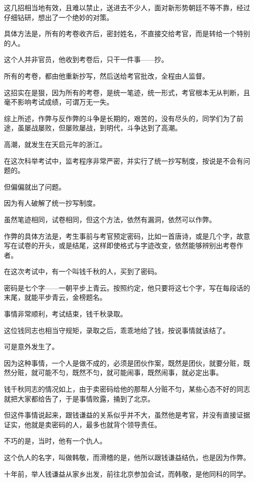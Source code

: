 \begin{multicols}{\theparacolNo}
这几招相当地有效，且难以禁止，送进去不少人，面对新形势朝廷不等不靠，经过仔细钻研，想出了一个绝妙的对策。

具体方法是，所有的考卷收齐后，密封姓名，不直接交给考官，而是转给一个特别的人。

这个人并非官员，他收到考卷后，只干一件事——抄。

所有的考卷，都由他重新抄写，然后送给考官批改，全程由人监督。

这招实在是狠，因为所有的考卷，是统一笔迹，统一形式，考官根本无从判断，且毫不影响考试成绩，可谓万无一失。

综上所述，作弊与反作弊的斗争是长期的，艰苦的，没有尽头的，同学们为了前途，虽屡战屡败，但屡败屡战，到明代，斗争达到了高潮。

高潮，就发生在天启元年的浙江。

在这次科举考试中，监考程序非常严密，并实行了统一抄写制度，按说是不会有问题的。

但偏偏就出了问题。

因为有人破解了统一抄写制度。

虽然笔迹相同，试卷相同，但这个方法，依然有漏洞，依然可以作弊。

作弊的具体方法是，考生事前与考官预定密码，比如一首唐诗，或是几个字，故意写在试卷的开头，或是结尾，这样即使格式与字迹改变，依然能够辨别出考卷作者。

在这次考试中，有一个叫钱千秋的人，买到了密码。

密码是七个字——一朝平步上青云。按照约定，他只要将这七个字，写在每段话的末尾，就能平步青云，金榜题名。

事情非常顺利，考试结束，钱千秋录取。

这位钱同志也相当守规矩，录取之后，乖乖地给了钱，按说事情就该结了。

可是意外发生了。

因为这种事情，一个人是做不成的，必须是团伙作案，既然是团伙，就要分赃，既然分赃，就可能不匀，既然不匀，就可能闹事，既然闹事，就必定出事。

钱千秋同志的情况如上，由于卖密码给他的那帮人分赃不匀，某些心态不好的同志就把大家都给告了，于是事情败露，捅到了北京。

但这件事情说起来，跟钱谦益的关系似乎并不大，虽然他是考官，并没有直接证据证实，他就是卖密码的人，最多也就背个领导责任。

不巧的是，当时，他有一个仇人。

这个仇人的名字，叫做韩敬，而滑稽的是，他所以跟钱谦益结仇，也是因为作弊。

十年前，举人钱谦益从家乡出发，前往北京参加会试，而韩敬，是他同科的同学。


\end{multicols}
